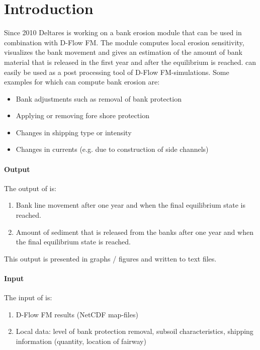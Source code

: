 \chapter{Introduction}

Since 2010 Deltares is working on a bank erosion module that can be used in combination with D-Flow FM.
The module computes local erosion sensitivity, visualizes the bank movement and gives an estimation of the amount of bank material that is released in the first year and after the equilibrium is reached.
\dfastbe can easily be used as a post processing tool of D-Flow FM-simulations.
Some examples for which \dfastbe can compute bank erosion are:

\begin{itemize}
\item Bank adjustments such as removal of bank protection
\item Applying or removing fore shore protection
\item Changes in shipping type or intensity
\item Changes in currents (e.g. due to construction of side channels)
\end{itemize}

\subsubsection*{Output}
The output of \dfastbe is:

\begin{enumerate}
\item Bank line movement after one year and when the final equilibrium state is reached.
\item Amount of sediment that is released from the banks after one year and when the final equilibrium state is reached.
\end{enumerate}

This output is presented in graphs / figures and written to text files.

\subsubsection*{Input}
The input of \dfastbe is:

\begin{enumerate}
\item D-Flow FM results (NetCDF map-files)
\item Local data: level of bank protection removal, subsoil characteristics, shipping information (quantity, location of fairway)
\end{enumerate}

